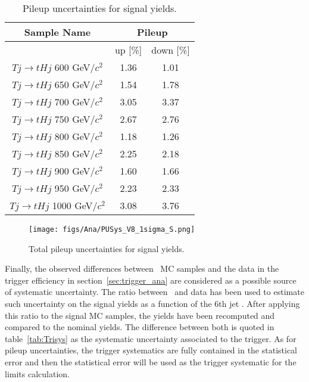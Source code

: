 \begin{table*}[htbH]
\begin{center}
\begin{tabular}{|c|c|c|}
\hline 
Sample Name & \multicolumn{2}{c|}{Pileup} \\
\hline
 & up [\%] & down [\%] \\
\hline
$Tj\rightarrow tHj$ 600 GeV/$c^{2}$ & 1.36 & 1.01 \\
$Tj\rightarrow tHj$ 650 GeV/$c^{2}$ & 1.54 & 1.78 \\
$Tj\rightarrow tHj$ 700 GeV/$c^{2}$ & 3.05 & 3.37 \\
$Tj\rightarrow tHj$ 750 GeV/$c^{2}$ & 2.67 & 2.76 \\
$Tj\rightarrow tHj$ 800 GeV/$c^{2}$ & 1.18 & 1.26 \\
$Tj\rightarrow tHj$ 850 GeV/$c^{2}$ & 2.25 & 2.18 \\
$Tj\rightarrow tHj$ 900 GeV/$c^{2}$ & 1.60 & 1.66 \\
$Tj\rightarrow tHj$ 950 GeV/$c^{2}$ & 2.23 & 2.33 \\
$Tj\rightarrow tHj$ 1000 GeV/$c^{2}$ & 3.08 & 3.76 \\
\hline
\end{tabular}
\caption{Pileup uncertainties for signal yields.\label{tab:PUsys}}
\end{center}
\end{table*}

\begin{figure}[!Hhtbp]
  \begin{center}
    \texttt{[image: figs/Ana/PUSys\_V8\_1sigma\_S.png]}
    \caption{Total pileup uncertainties for signal yields.}
    \label{fig:TotalPUSys}
  \end{center}
\end{figure}

Finally, the observed differences between \ttbar~MC samples and the data in the trigger efficiency in section~\ref{sec:trigger_ana} are considered as a possible source of systematic uncertainty. The ratio between \ttbar~and data has been used to estimate such uncertainty on the signal yields as a function of the 6th jet \pt. After applying this ratio to the signal MC samples, the yields have been recomputed and compared to the nominal yields. The difference between both is quoted in table~\ref{tab:Trisys} as the systematic uncertainty associated to the trigger. As for pileup uncertainties, the trigger systematics are fully contained in the statistical error and then the statistical error will be used as the trigger systematic for the limits calculation.

